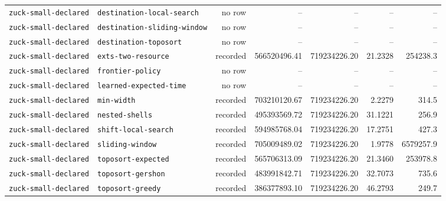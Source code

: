 \begin{longtable}{>{\raggedright\arraybackslash}p{}>{\raggedright\arraybackslash}p{}r r r r r}
\texttt{zuck\allowbreak-small\allowbreak-declared} & \texttt{destination\allowbreak-local\allowbreak-search} & no row & -- & -- & -- & -- \\
\texttt{zuck\allowbreak-small\allowbreak-declared} & \texttt{destination\allowbreak-sliding\allowbreak-window} & no row & -- & -- & -- & -- \\
\texttt{zuck\allowbreak-small\allowbreak-declared} & \texttt{destination\allowbreak-toposort} & no row & -- & -- & -- & -- \\
\texttt{zuck\allowbreak-small\allowbreak-declared} & \texttt{exts\allowbreak-two\allowbreak-resource} & recorded & 566520496.41 & 719234226.20 & 21.2328 & 254238.3 \\
\texttt{zuck\allowbreak-small\allowbreak-declared} & \texttt{frontier\allowbreak-policy} & no row & -- & -- & -- & -- \\
\texttt{zuck\allowbreak-small\allowbreak-declared} & \texttt{learned\allowbreak-expected\allowbreak-time} & no row & -- & -- & -- & -- \\
\texttt{zuck\allowbreak-small\allowbreak-declared} & \texttt{min\allowbreak-width} & recorded & 703210120.67 & 719234226.20 & 2.2279 & 314.5 \\
\texttt{zuck\allowbreak-small\allowbreak-declared} & \texttt{nested\allowbreak-shells} & recorded & 495393569.72 & 719234226.20 & 31.1221 & 256.9 \\
\texttt{zuck\allowbreak-small\allowbreak-declared} & \texttt{shift\allowbreak-local\allowbreak-search} & recorded & 594985768.04 & 719234226.20 & 17.2751 & 427.3 \\
\texttt{zuck\allowbreak-small\allowbreak-declared} & \texttt{sliding\allowbreak-window} & recorded & 705009489.02 & 719234226.20 & 1.9778 & 6579257.9 \\
\texttt{zuck\allowbreak-small\allowbreak-declared} & \texttt{toposort\allowbreak-expected} & recorded & 565706313.09 & 719234226.20 & 21.3460 & 253978.8 \\
\texttt{zuck\allowbreak-small\allowbreak-declared} & \texttt{toposort\allowbreak-gershon} & recorded & 483991842.71 & 719234226.20 & 32.7073 & 735.6 \\
\texttt{zuck\allowbreak-small\allowbreak-declared} & \texttt{toposort\allowbreak-greedy} & recorded & 386377893.10 & 719234226.20 & 46.2793 & 249.7 \\
\bottomrule\end{longtable}\endgroup
